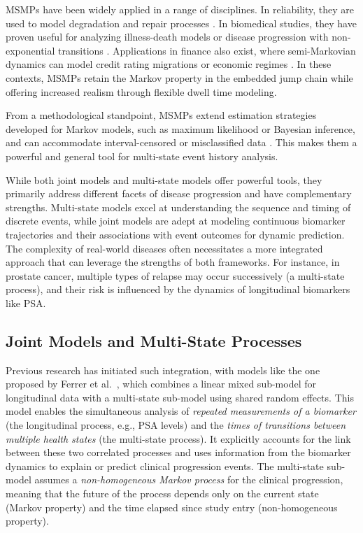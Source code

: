 \documentclass{sn-jnl}
\begin{document}
MSMPs have been widely applied in a range of disciplines. In reliability, they are used to model degradation and repair processes \citep{limnios2001semi}. In biomedical studies, they have proven useful for analyzing illness-death models or disease progression with non-exponential transitions \citep{commenges2006likelihood, fiocco2008modelling}. Applications in finance also exist, where semi-Markovian dynamics can model credit rating migrations or economic regimes \citep{luciano2006semi}. In these contexts, MSMPs retain the Markov property in the embedded jump chain while offering increased realism through flexible dwell time modeling.

From a methodological standpoint, MSMPs extend estimation strategies developed for Markov models, such as maximum likelihood or Bayesian inference, and can accommodate interval-censored or misclassified data \citep{frydman2005estimation}. This makes them a powerful and general tool for multi-state event history analysis.

While both joint models and multi-state models offer powerful tools, they primarily address different facets of disease progression and have complementary strengths. Multi-state models excel at understanding the sequence and timing of discrete events, while joint models are adept at modeling continuous biomarker trajectories and their associations with event outcomes for dynamic prediction. The complexity of real-world diseases often necessitates a more integrated approach that can leverage the strengths of both frameworks. For instance, in prostate cancer, multiple types of relapse may occur successively (a multi-state process), and their risk is influenced by the dynamics of longitudinal biomarkers like PSA.

\subsection{Joint Models and Multi-State Processes}

Previous research has initiated such integration, with models like the one proposed by Ferrer et al.~\citep{ferrer2016joint}, which combines a linear mixed sub-model for longitudinal data with a multi-state sub-model using shared random effects. This model enables the simultaneous analysis of \emph{repeated measurements of a biomarker} (the longitudinal process, e.g., PSA levels) and the \emph{times of transitions between multiple health states} (the multi-state process). It explicitly accounts for the link between these two correlated processes and uses information from the biomarker dynamics to explain or predict clinical progression events. The multi-state sub-model assumes a \emph{non-homogeneous Markov process} for the clinical progression, meaning that the future of the process depends only on the current state (Markov property) and the time elapsed since study entry (non-homogeneous property).
\end{document}
